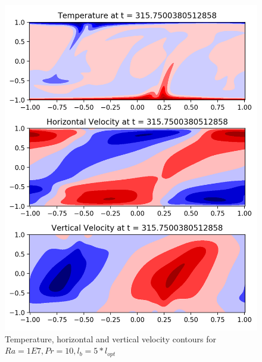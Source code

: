 \documentclass[12pt]{article}
\begin{document}
     \begin{figure}[!htb]
     	\includegraphics[width=\linewidth]{contours_1E7_10_5.png}
     	\caption{Temperature, horizontal and vertical velocity contours for $Ra = 1E7, Pr =10, l_b = 5* l_{opt} $ }
     	\label{fig:fig20}
     \end{figure}
     
\end{document}
